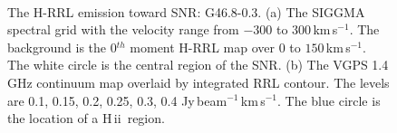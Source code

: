 \documentclass[manuscript]{aastex61}
\newcommand{\hii}{{\rm H\,}{{\sc ii}}}
\newcommand{\kms}{\,km\,s$^{-1}$}
\begin{document}
\begin{figure}[H]
	\centering
	\\
	\caption{The H-RRL emission toward SNR: G46.8-0.3.
	(a) The SIGGMA spectral grid with the velocity range from $-300$ to $300$\kms.
	The background is the 0$^{th}$ moment H-RRL map over $0$ to $150$\kms.
	The white circle is the central region of the SNR.
	(b) The VGPS 1.4 GHz continuum map overlaid by integrated RRL contour.
	The levels are 0.1, 0.15, 0.2, 0.25, 0.3, 0.4 Jy\,beam$^{-1}$\kms.
	The blue circle is the location of a \hii\ region.
	}
	\label{fig_snr-g468}
\end{figure}
\end{document}
